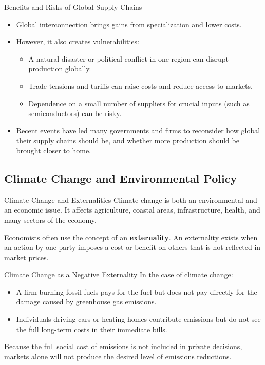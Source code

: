 \documentclass[aspectratio=169]{beamer}
\begin{document}
\begin{frame}{Benefits and Risks of Global Supply Chains}
  \transfade
  \begin{itemize}
    \item Global interconnection brings gains from specialization and lower costs.
    \item However, it also creates vulnerabilities:
          \begin{itemize}
            \item A natural disaster or political conflict in one region can disrupt production globally.
            \item Trade tensions and tariffs can raise costs and reduce access to markets.
            \item Dependence on a small number of suppliers for crucial inputs (such as semiconductors)
            can be risky.
          \end{itemize}
    \item Recent events have led many governments and firms to reconsider how global their
    supply chains should be, and whether more production should be brought closer to home.
  \end{itemize}
\end{frame}

\subsection{Climate Change and Environmental Policy}

\begin{frame}{Climate Change and Externalities}
  \transfade
  Climate change is both an environmental and an economic issue. It affects agriculture,
  coastal areas, infrastructure, health, and many sectors of the economy.

  \vspace{0.2cm}
  Economists often use the concept of an \textbf{externality}. An externality exists when an action
  by one party imposes a cost or benefit on others that is not reflected in market prices.
\end{frame}

\begin{frame}{Climate Change as a Negative Externality}
  \transfade
  In the case of climate change:

  \begin{itemize}
    \item A firm burning fossil fuels pays for the fuel but does not pay directly for the damage
    caused by greenhouse gas emissions.
    \item Individuals driving cars or heating homes contribute emissions but do not see the full
    long-term costs in their immediate bills.
  \end{itemize}

  \vspace{0.3cm}
  Because the full social cost of emissions is not included in private decisions, markets alone
  will not produce the desired level of emissions reductions.
\end{frame}
\end{document}
